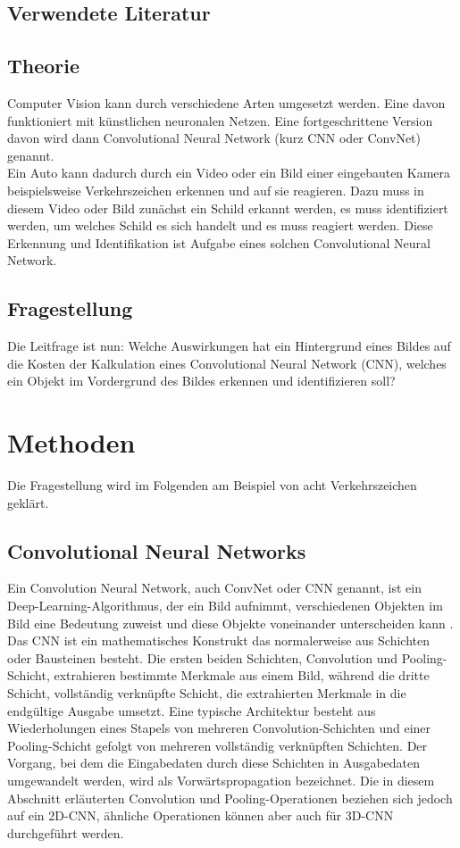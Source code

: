 \documentclass[paper=A4,pagesize=auto,12pt,headinclude=true,footinclude=true,BCOR=0mm,DIV=calc]{scrartcl}
\begin{document}
\subsection{Verwendete Literatur}

\subsection{Theorie} %
Computer Vision kann durch verschiedene Arten umgesetzt werden. Eine davon funktioniert mit künstlichen neuronalen Netzen. Eine fortgeschrittene Version davon wird dann Convolutional Neural Network (kurz CNN oder ConvNet) genannt.\\
Ein Auto kann dadurch durch ein Video oder ein Bild einer eingebauten Kamera beispielsweise Verkehrszeichen erkennen und auf sie reagieren. Dazu muss in diesem Video oder Bild zunächst ein Schild erkannt werden, es muss identifiziert werden, um welches Schild es sich handelt und es muss reagiert werden. Diese Erkennung und Identifikation ist Aufgabe eines solchen Convolutional Neural Network.

\subsection{Fragestellung}
Die Leitfrage ist nun: Welche Auswirkungen hat ein Hintergrund eines Bildes auf die Kosten der Kalkulation eines Convolutional Neural Network (CNN), welches ein Objekt im Vordergrund des Bildes erkennen und identifizieren soll?


\section{Methoden}
Die Fragestellung wird im Folgenden am Beispiel von acht Verkehrszeichen geklärt.

\subsection{Convolutional Neural Networks} %
Ein Convolution Neural Network, auch ConvNet oder CNN genannt, ist ein Deep-Learning-Algorithmus, der ein Bild aufnimmt, verschiedenen Objekten im Bild eine Bedeutung zuweist und diese Objekte voneinander unterscheiden kann \cite{cnn1}. Das CNN ist ein mathematisches Konstrukt das normalerweise aus Schichten oder Bausteinen besteht. Die ersten beiden Schichten, Convolution und Pooling-Schicht, extrahieren bestimmte Merkmale aus einem Bild, während die dritte Schicht, vollständig verknüpfte Schicht, die extrahierten Merkmale in die endgültige Ausgabe umsetzt. Eine typische Architektur besteht aus Wiederholungen eines Stapels von mehreren Convolution-Schichten und einer Pooling-Schicht gefolgt von mehreren vollständig verknüpften Schichten. Der Vorgang, bei dem die Eingabedaten durch diese Schichten in Ausgabedaten umgewandelt werden, wird als Vorwärtspropagation bezeichnet. Die in diesem Abschnitt erläuterten Convolution und Pooling-Operationen beziehen sich jedoch auf ein 2D-CNN, ähnliche Operationen können aber auch für 3D-CNN durchgeführt werden.\cite{cnn2}
\end{document}
